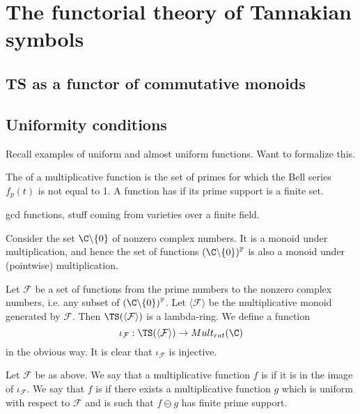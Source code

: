 
\section{The functorial theory of Tannakian symbols}


\subsection{\textbf{TS} as a functor of commutative monoids}

\subsection{Uniformity conditions}
Recall examples of uniform and almost uniform functions. Want to formalize this.

\begin{definition}
The  of a multiplicative function is the set of primes for which the Bell series $f_p(t)$ is not equal to 1. A function has  if its prime support is a finite set. 
\end{definition}

\begin{example}
gcd functions, stuff coming from varieties over a finite field.
\end{example}

Consider the set $\C \backslash \{ 0\}$ of nonzero complex numbers. It is a monoid under multiplication, and hence the set of functions $(\C \backslash \{ 0 \})^{\mathbb{P}}$ is also a monoid under (pointwise) multiplication.

Let $\mathcal{F}$ be a set of functions from the prime numbers to the nonzero complex numbers, i.e. any subset of $(\C \backslash \{ 0 \})^{\mathbb{P}}$. Let $\langle \mathcal{F} \rangle$ be the multiplicative monoid generated by $\mathcal{F}$. Then $\TS(\langle \mathcal{F} \rangle)$ is a lambda-ring. We define a function
$$ \iota_{\mathcal{F}} : \TS(\langle \mathcal{F} \rangle) \to Mult_{rat}(\C)  $$
in the obvious way. It is clear that $\iota_{\mathcal{F}}$ is injective.



\begin{definition}
Let $\mathcal{F}$ be as above. We say that a multiplicative function $f$ is  if it is in the image of $\iota_{\mathcal{F}}$. We say that $f$ is  if there exists a multiplicative function $g$ which is uniform with respect to $\mathcal{F}$ and is such that $f \ominus g$ has finite prime support. 
\end{definition}

